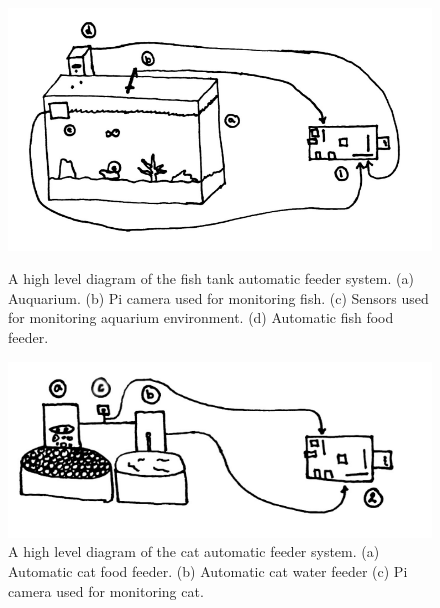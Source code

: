 \begin{figure}[H]
    \centering
    \begin{minipage}[b]{0.45\linewidth}
        \centering
        \captionsetup{justification=centering, margin = 0.5cm}
        \includegraphics[scale=0.3]{images/PubFishTank} 
        \caption{A high level diagram of the fish tank automatic feeder system. (a)
        Auquarium. (b) Pi camera used for monitoring fish. (c) Sensors used for
        monitoring aquarium environment. (d) Automatic fish food feeder.}
        \label{fig:fig1}
    \end{minipage}
    \quad
    \begin{minipage}[b]{0.45\linewidth}
        \centering
        \captionsetup{justification=centering, margin = 0.5cm}
        \includegraphics[scale=0.4]{images/PubCat} 
        \caption{A high level diagram of the cat automatic feeder system. (a)
        Automatic cat food feeder. (b) Automatic cat water feeder (c) Pi camera used
        for monitoring cat.}
        \label{fig:fig2}
    \end{minipage}
\end{figure}


